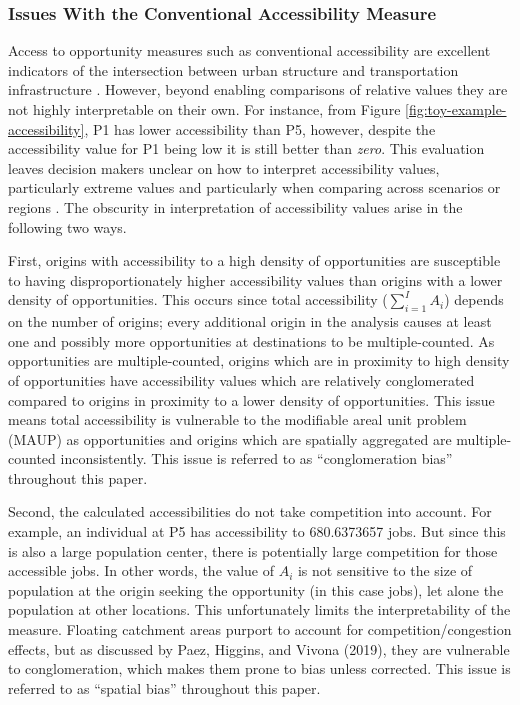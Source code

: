 \documentclass[]{elsarticle} %
\begin{document}
\hypertarget{issues-with-the-conventional-accessibility-measure}{%
\subsubsection{Issues With the Conventional Accessibility
Measure}\label{issues-with-the-conventional-accessibility-measure}}

Access to opportunity measures such as conventional accessibility are
excellent indicators of the intersection between urban structure and
transportation infrastructure . However, beyond enabling comparisons of
relative values they are not highly interpretable on their own. For
instance, from Figure \ref{fig:toy-example-accessibility}, P1 has lower
accessibility than P5, however, despite the accessibility value for P1
being low it is still better than \emph{zero}. This evaluation leaves
decision makers unclear on how to interpret accessibility values,
particularly extreme values and particularly when comparing across
scenarios or regions . The obscurity in interpretation of accessibility
values arise in the following two ways.

First, origins with accessibility to a high density of opportunities are
susceptible to having disproportionately higher accessibility values
than origins with a lower density of opportunities. This occurs since
total accessibility (\(\sum_{i=1}^IA_i\)) depends on the number of
origins; every additional origin in the analysis causes at least one and
possibly more opportunities at destinations to be multiple-counted. As
opportunities are multiple-counted, origins which are in proximity to
high density of opportunities have accessibility values which are
relatively conglomerated compared to origins in proximity to a lower
density of opportunities. This issue means total accessibility is
vulnerable to the modifiable areal unit problem (MAUP) as opportunities
and origins which are spatially aggregated are multiple-counted
inconsistently. This issue is referred to as ``conglomeration bias''
throughout this paper.

Second, the calculated accessibilities do not take competition into
account. For example, an individual at P5 has accessibility to
680.6373657 jobs. But since this is also a large population center,
there is potentially large competition for those accessible jobs. In
other words, the value of \(A_i\) is not sensitive to the size of
population at the origin seeking the opportunity (in this case jobs),
let alone the population at other locations. This unfortunately limits
the interpretability of the measure. Floating catchment areas purport to
account for competition/congestion effects, but as discussed by Paez,
Higgins, and Vivona (2019), they are vulnerable to conglomeration, which
makes them prone to bias unless corrected. This issue is referred to as
``spatial bias'' throughout this paper.
\end{document}
